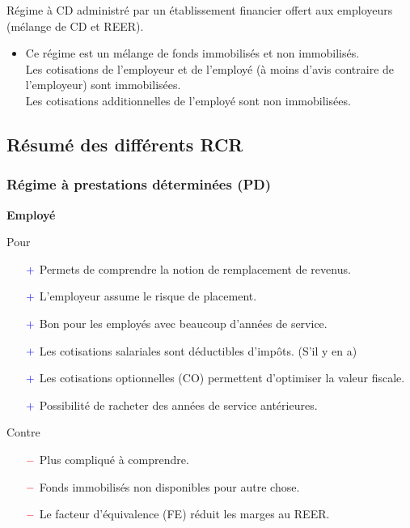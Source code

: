 \documentclass[10pt, french]{article}
\begin{document}
\begin{multicols*}{3}
\begin{definitionNOHFILL}
Régime à CD administré par un établissement financier offert aux employeurs (mélange de CD et REER).

\begin{itemize}[leftmargin = *]
	\item	Ce régime est un mélange de fonds immobilisés et non immobilisés. \\
			Les cotisations de l'employeur et de l'employé (à moins d’avis contraire de l’employeur) sont immobilisées. \\
			Les cotisations additionnelles de l'employé sont non immobilisées.
\end{itemize}
\end{definitionNOHFILL}


\columnbreak
\subsection{Résumé des différents RCR}

\subsubsection*{Régime à prestations déterminées (PD)}
\begin{center}
	\textbf{Employé}
\end{center}
Pour
\begin{itemize}
	\item[$\color{blue}+$]	Permets de comprendre la notion de remplacement de revenus.
	\item[$\color{blue}+$]	L'employeur assume le risque de placement.
	\item[$\color{blue}+$]	Bon pour les employés avec beaucoup d'années de service.
	\item[$\color{blue}+$]	Les cotisations salariales sont déductibles d'impôts. (S'il y en a)
	\item[$\color{blue}+$]	Les cotisations optionnelles (CO) permettent d'optimiser la valeur fiscale.
	\item[$\color{blue}+$]	Possibilité de racheter des années de service antérieures.
\end{itemize}

Contre
\begin{itemize}
	\item[$\color{red}-$]	Plus compliqué à comprendre.
	\item[$\color{red}-$]	Fonds immobilisés non disponibles pour autre chose.
	\item[$\color{red}-$]	Le facteur d'équivalence (FE) réduit les marges au REER.
\end{itemize}


\end{multicols*}
\end{document}
